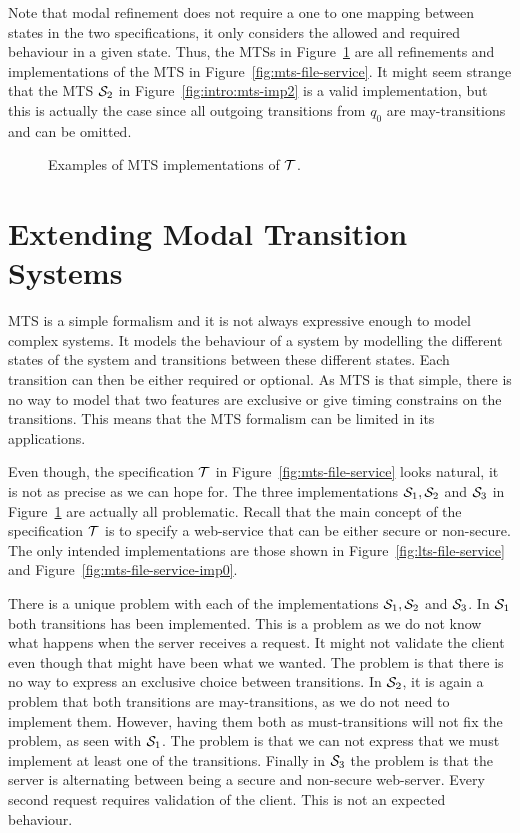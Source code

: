Note that modal refinement does not require a one to one mapping between states in the two specifications, it only considers the allowed and required behaviour in a given state. Thus, the MTSs in Figure~\ref{fig:mts-file-service-imps} are all refinements and implementations of the MTS in Figure~\ref{fig:mts-file-service}. It might seem strange that the MTS $\S_2$ in Figure~\ref{fig:intro:mts-imp2} is a valid implementation, but this is actually the case since all outgoing transitions from $q_0$ are may-transitions and can be omitted.

\begin{figure}[ht]        
\centering
    \caption{Examples of MTS implementations of $\T$.}
    \label{fig:mts-file-service-imps}
\end{figure} 

\section{Extending Modal Transition Systems}
MTS is a simple formalism and it is not always expressive enough to model complex systems. It models the behaviour of a system by modelling the different states of the system and transitions between these different states. Each transition can then be either required or optional. As MTS is that simple, there is no way to model that two features are exclusive or give timing constrains on the transitions. This means that the MTS formalism can be limited in its applications. 

Even though, the specification $\T$ in Figure~\ref{fig:mts-file-service} looks natural, it is not as precise as we can hope for. The three implementations $\S_1,\S_2$ and $\S_3$ in Figure~\ref{fig:mts-file-service-imps} are actually all problematic. Recall that the main concept of the specification $\T$ is to specify a web-service that can be either secure or non-secure. The only intended implementations are those shown in Figure~\ref{fig:lts-file-service} and Figure~\ref{fig:mts-file-service-imp0}. 

There is a unique problem with each of the implementations $\S_1,\S_2$ and $\S_3$. In $\S_1$ both  transitions has been implemented. This is a problem as we do not know what happens when the server receives a request. It might not validate the client even though that might have been what we wanted. The problem is that there is no way to express an exclusive choice between transitions. In $\S_2$, it is again a problem that both  transitions are may-transitions, as we do not need to implement them. However, having them both as must-transitions will not fix the problem, as seen with $\S_1$. The problem is that we can not express that we must implement at least one of the transitions. Finally in $\S_3$ the problem is that the server is alternating between being a secure and non-secure web-server. Every second request requires validation of the client. This is not an expected behaviour.


